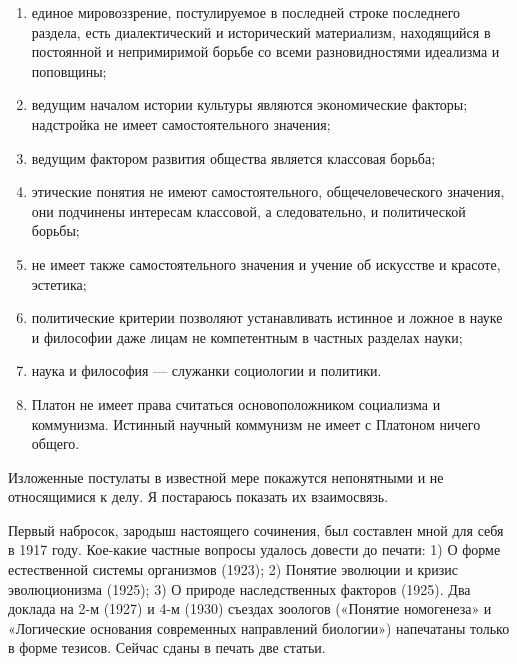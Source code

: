\begin{enumerate}

  \item единое мировоззрение, постулируемое в последней строке
        последнего раздела, есть диалектический и исторический
        материализм, находящийся в постоянной и непримиримой борьбе
        со всеми разновидностями идеализма и поповщины;

  \item ведущим началом истории культуры являются экономические
        факторы; надстройка не имеет самостоятельного значения;

  \item ведущим фактором развития общества является классовая
        борьба;

  \item этические понятия не имеют самостоятельного,
        общечеловеческого значения, они подчинены интересам
        классовой, а следовательно, и политической борьбы;

  \item не имеет также самостоятельного значения и учение об
        искусстве и красоте, эстетика;

  \item политические критерии позволяют устанавливать истинное и
        ложное в науке и философии даже лицам не компетентным в
        частных разделах науки;

  \item наука и философия --- служанки социологии и политики.

  \item Платон не имеет права считаться основоположником социализма
        и коммунизма. Истинный научный коммунизм не имеет с Платоном
        ничего общего.

\end{enumerate}

Изложенные постулаты в известной мере покажутся непонятными и не
относящимися к делу. Я постараюсь показать их взаимосвязь.

Первый набросок, зародыш настоящего сочинения, был составлен мной для
себя в 1917 году. Кое-какие частные вопросы удалось довести до печати:
1) О форме естественной системы организмов (1923); 2) Понятие эволюции
и кризис эволюционизма (1925); 3) О природе наследственных факторов
(1925). Два доклада на 2-м (1927) и 4-м (1930) съездах зоологов
(«Понятие номогенеза» и «Логические основания современных направлений
биологии») напечатаны только в форме тезисов. Сейчас сданы в печать
две статьи.

